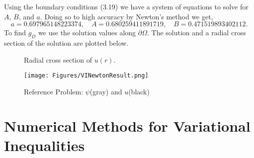 \documentclass[12 pt]{report}
\begin{document}
Using the boundary conditions (3.19) we have a system of equations to solve for $A$, $B$, and $a$. Doing so to high accuracy by Newton's method we get, 
 \begin{equation}
  a = 0.697965148223374, \quad A = 0.680259411891719, \quad B = 0.471519893402112.
 \end{equation}
 To find $g_D$ we use the solution values along $\partial \Omega$. The solution and a radial cross section of the solution are plotted below.
 \begin{figure}[H]
  \begin{center}
  \caption{Radial cross section of $u(r)$.}
\end{center}
\end{figure}
\begin{figure}[H]
  \texttt{[image: Figures/VINewtonResult.png]}
  \caption{Reference Problem: $\psi$(gray) and $u$(black)}
\end{figure}




\section{Numerical Methods for Variational Inequalities}
\end{document}
